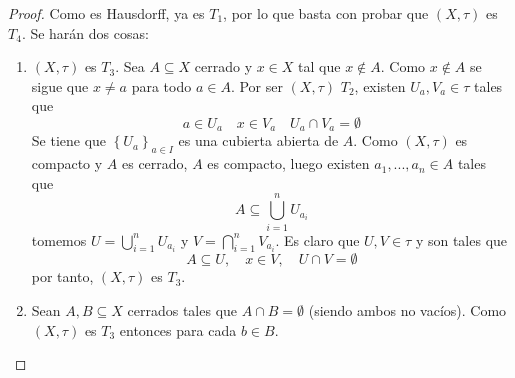 \documentclass[12pt]{report}
\theoremstyle{largebreak}
\begin{document}
    \begin{proof}
        Como es Hausdorff, ya es $T_1$, por lo que basta con probar que $(X,\tau)$ es $T_4$. Se harán dos cosas:
        \begin{enumerate}
            \item $(X,\tau)$ es $T_3$. Sea $A\subseteq X$ cerrado y $x\in X$ tal que $x\notin A$. Como $x\notin A$ se sigue que $x\neq a$ para todo $a\in A$. Por ser $(X,\tau)$ $T_2$, existen $U_a,V_a\in\tau$ tales que
            \begin{equation*}
                a\in U_a\quad x\in V_a\quad U_a\cap V_a=\emptyset
            \end{equation*}
            Se tiene que $\left\{U_a\right\}_{a\in I}$ es una cubierta abierta de $A$. Como $(X,\tau)$ es compacto y $A$ es cerrado, $A$ es compacto, luego existen $a_1,...,a_n\in A$ tales que
            \begin{equation*}
                A\subseteq\bigcup_{ i=1}^n U_{a_i}
            \end{equation*}
            tomemos $U=\bigcup_{ i=1}^n U_{a_i}$ y $V=\bigcap_{ i=1}^n V_{a_i}$. Es claro que $U,V\in\tau$ y son tales que
            \begin{equation*}
                A\subseteq U,\quad x\in V,\quad U\cap V=\emptyset 
            \end{equation*}
            por tanto, $(X,\tau)$ es $T_3$.
            \item Sean $A,B\subseteq X$ cerrados tales que $A\cap B=\emptyset$ (siendo ambos no vacíos). Como $(X,\tau)$ es $T_3$ entonces para cada $b\in B$.
        \end{enumerate}
    \end{proof}
    
\end{document}
